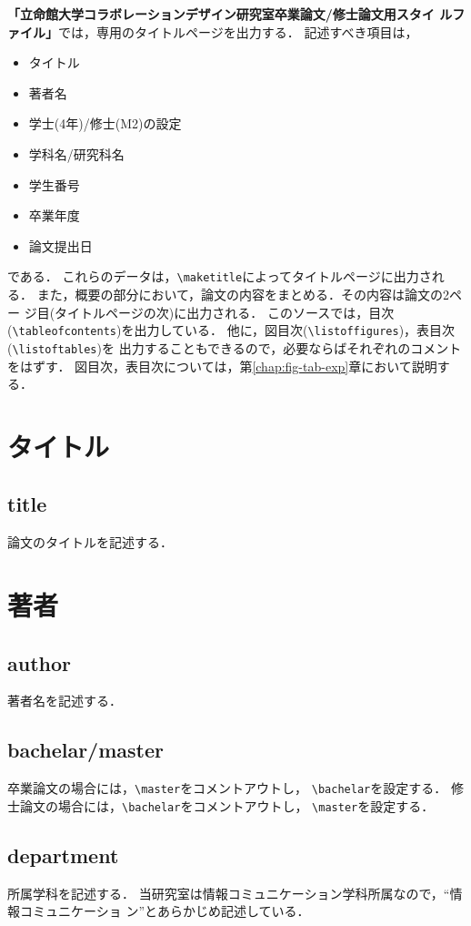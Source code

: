 \documentclass[11pt]{ujreport}
\begin{document}
{\bf 「立命館大学コラボレーションデザイン研究室卒業論文/修士論文用スタイ
ルファイル」}では，専用のタイトルページを出力する．
記述すべき項目は，
\begin{itemize}
  \item タイトル
  \item 著者名
  \item 学士(4年)/修士(M2)の設定
  \item 学科名/研究科名
  \item 学生番号
  \item 卒業年度
  \item 論文提出日
\end{itemize}
である．
これらのデータは，\verb|\maketitle|によってタイトルページに出力される．
また，概要の部分において，論文の内容をまとめる．その内容は論文の2ペー
ジ目(タイトルページの次)に出力される．
このソースでは，目次(\verb|\tableofcontents|)を出力している．
他に，図目次(\verb|\listoffigures|)，表目次(\verb|\listoftables|)を
出力することもできるので，必要ならばそれぞれのコメントをはずす．
図目次，表目次については，第\ref{chap:fig-tab-exp}章において説明する．

\section{タイトル}
\subsection{title}
論文のタイトルを記述する．

\section{著者}
\subsection{author}
著者名を記述する．

\subsection{bachelar/master}
卒業論文の場合には，\verb|\master|をコメントアウトし，
\verb|\bachelar|を設定する．
修士論文の場合には，\verb|\bachelar|をコメントアウトし，
\verb|\master|を設定する．

\subsection{department}
所属学科を記述する．
当研究室は情報コミュニケーション学科所属なので，``情報コミュニケーショ
ン''とあらかじめ記述している．
\end{document}

